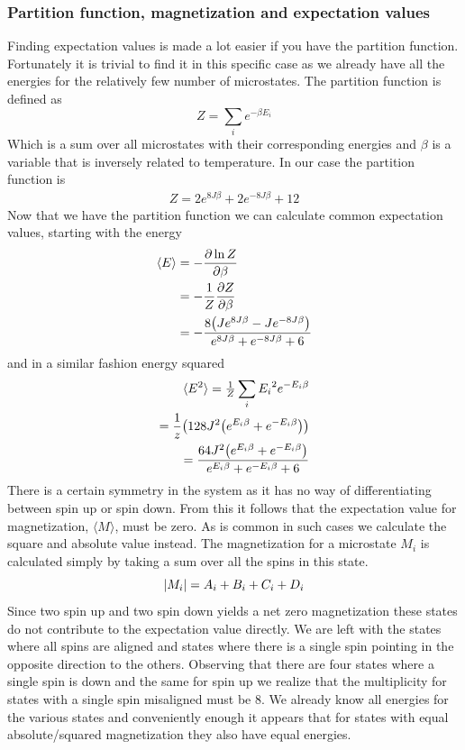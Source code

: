\documentclass[a4paper, 12pt]{article}
\newcommand{\expect}[1]{\langle #1 \rangle}
\begin{document}
{	\subsubsection{Partition function, magnetization and expectation values}
		Finding expectation values is made a lot easier if you have the partition function. Fortunately it is trivial to find it in this specific case as we already have all the energies for the relatively few number of microstates. The partition function is defined as
		\begin{equation}
			Z = \sum_ie^{-\beta E_i}
		\end{equation}
		Which is a sum over all microstates with their corresponding energies and $\beta$ is a variable that is inversely related to temperature. In our case the partition function is
		\begin{align*}
			Z = 2e^{8J\beta}+2e^{-8J\beta}+12
		\end{align*}
		Now that we have the partition function we can calculate common expectation values, starting with the energy
		\begin{align*}
			\langle E \rangle & = - \pdv{\ln{Z}}{\beta}\\
			& = - \frac{1}{Z} \pdv{Z}{\beta} \\
			&= - \frac{8\qty(Je^{8J\beta}-Je^{-8J\beta})}{e^{8J\beta} + e^{-8J\beta} + 6}
		\end{align*}
		and in a similar fashion energy squared
		\begin{align*}
			\expect{E^2} = \tfrac{1}{Z} \sum_i {E_i}^2 e^{-E_i\beta}\\
			= \frac{1}{z} \qty(128J^2\qty(e^{E_i\beta} + e^{-E_i\beta}))\\
			= \frac{64J^2\qty(e^{E_i\beta} + e^{-E_i\beta})}{e^{E_i\beta} + e^{-E_i\beta} + 6}
		\end{align*}
		There is a certain symmetry in the system as it has no way of differentiating between spin up or spin down. From this it follows that the expectation value for magnetization, $\langle M \rangle$, must be zero. As is common in such cases we calculate the square and absolute value instead. The magnetization for a microstate $M_i$ is calculated simply by taking a sum over all the spins in this state. 
		$$ \abs{M_i} = A_i + B_i + C_i + D_i $$
		Since two spin up and two spin down yields a net zero magnetization these states do not contribute to the expectation value directly. We are left with the states where all spins are aligned and states where there is a single spin pointing in the opposite direction to the others. Observing that there are four states where a single spin is down and the same for spin up we realize that the multiplicity for states with a single spin misaligned must be 8. We already know all energies for the various states and conveniently enough it appears that for states with equal absolute/squared magnetization they also have equal energies.

}
\end{document}
